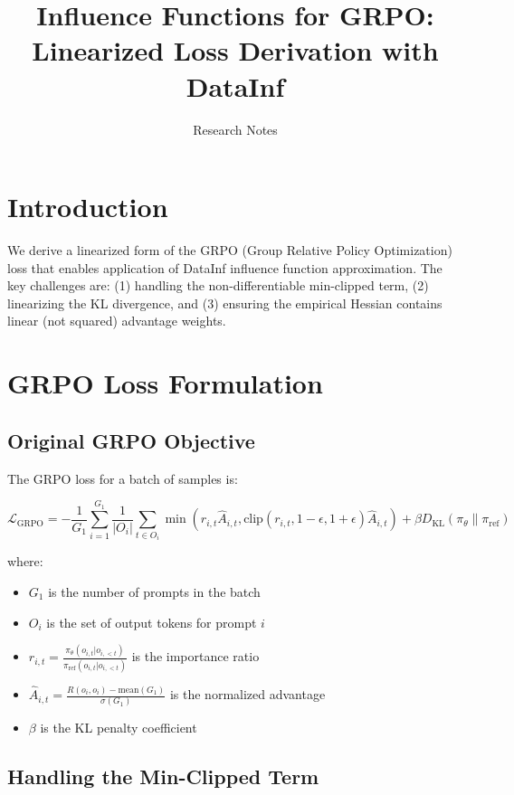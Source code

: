 \documentclass{article}
\title{Influence Functions for GRPO: Linearized Loss Derivation with DataInf}
\author{Research Notes}
\date{}
\begin{document}
\maketitle

\section{Introduction}

We derive a linearized form of the GRPO (Group Relative Policy Optimization) loss that enables application of DataInf influence function approximation. The key challenges are: (1) handling the non-differentiable min-clipped term, (2) linearizing the KL divergence, and (3) ensuring the empirical Hessian contains linear (not squared) advantage weights.

\section{GRPO Loss Formulation}

\subsection{Original GRPO Objective}

The GRPO loss for a batch of samples is:

\begin{equation}
\mathcal{L}_{\text{GRPO}} = -\frac{1}{G_1}\sum_{i=1}^{G_1} \frac{1}{|O_i|}\sum_{t \in O_i} \min\left(r_{i,t} \hat{A}_{i,t}, \text{clip}(r_{i,t}, 1-\epsilon, 1+\epsilon)\hat{A}_{i,t}\right) + \beta D_{\text{KL}}(\pi_\theta \| \pi_{\text{ref}})
\end{equation}

where:
\begin{itemize}
    \item $G_1$ is the number of prompts in the batch
    \item $O_i$ is the set of output tokens for prompt $i$
    \item $r_{i,t} = \frac{\pi_\theta(o_{i,t}|o_{i,<t})}{\pi_{\text{ref}}(o_{i,t}|o_{i,<t})}$ is the importance ratio
    \item $\hat{A}_{i,t} = \frac{R(o_i, o_i) - \text{mean}(G_1)}{\sigma(G_1)}$ is the normalized advantage
    \item $\beta$ is the KL penalty coefficient
\end{itemize}

\subsection{Handling the Min-Clipped Term}
\end{document}
